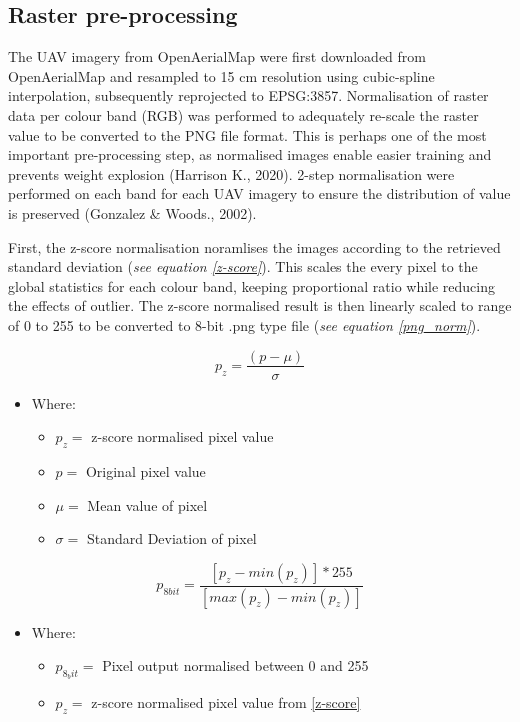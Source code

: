 \documentclass[11pt, a4paper, twoside]{report}
\begin{document}
\subsection{Raster pre-processing}

The UAV imagery from OpenAerialMap were first downloaded from OpenAerialMap and resampled to 15 cm resolution using cubic-spline interpolation, subsequently reprojected to EPSG:3857. Normalisation of raster data per colour band (RGB) was performed to adequately re-scale the raster value to be converted to the PNG file format. This is perhaps one of the most important pre-processing step, as normalised images enable easier training and prevents weight explosion (Harrison K., 2020). 2-step normalisation were performed on each band for each UAV imagery to ensure the distribution of value is preserved (Gonzalez \& Woods., 2002).\\\par

First, the z-score normalisation noramlises the images according to the retrieved standard deviation (\textit{see equation \ref{z-score}}). This scales the every pixel to the global statistics for each colour band, keeping proportional ratio while reducing the effects of outlier. The z-score normalised result is then linearly scaled to range of 0 to 255 to be converted to 8-bit .png type file (\textit{see equation \ref{png_norm}}).

\begin{equation}
  \label{z-score}
  p_{z} = \frac{(p - \mu)}{\sigma}
\end{equation}

\begin{itemize}
  \item Where:
    \begin{itemize}
      \item $p_{z} =$ z-score normalised pixel value
      \item $p =$ Original pixel value
      \item $\mu =$ Mean value of pixel
      \item $\sigma =$ Standard Deviation of pixel
    \end{itemize}
\end{itemize}

\begin{equation}
  \label{png_norm}
  p_{8 bit} = \frac{[p_{z} - min(p_{z})] * 255}{[max(p_{z}) - min(p_{z})]}
\end{equation}

\begin{itemize}
  \item Where:
    \begin{itemize}
      \item $p_{8_bit} =$ Pixel output normalised between 0 and 255
      \item $p_{z} =$ z-score normalised pixel value from \ref{z-score}
    \end{itemize}
\end{itemize}
\end{document}
